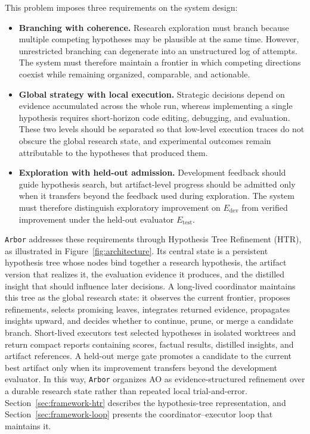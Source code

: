\documentclass{llmxive}
\providecommand{\arbor}{\texttt{Arbor}}
\begin{document}
This problem imposes three requirements on the system design:

\begin{itemize}[leftmargin=*]

    \item \textbf{Branching with coherence.} Research exploration must branch because multiple competing hypotheses may be plausible at the same time. However, unrestricted branching can degenerate into an unstructured log of attempts. The system must therefore maintain a frontier in which competing directions coexist while remaining organized, comparable, and actionable.

    \item \textbf{Global strategy with local execution.} Strategic decisions depend on evidence accumulated across the whole run, whereas implementing a single hypothesis requires short-horizon code editing, debugging, and evaluation. These two levels should be separated so that low-level execution traces do not obscure the global research state, and experimental outcomes remain attributable to the hypotheses that produced them.

    \item \textbf{Exploration with held-out admission.} Development feedback should guide hypothesis search, but artifact-level progress should be admitted only when it transfers beyond the feedback used during exploration. The system must therefore distinguish exploratory improvement on $E_{\mathrm{dev}}$ from verified improvement under the held-out evaluator $E_{\mathrm{test}}$.

\end{itemize}

\arbor{} addresses these requirements through Hypothesis Tree Refinement (HTR), as illustrated in Figure~\ref{fig:architecture}. Its central state is a persistent hypothesis tree whose nodes bind together a research hypothesis, the artifact version that realizes it, the evaluation evidence it produces, and the distilled insight that should influence later decisions. A long-lived coordinator maintains this tree as the global research state: it observes the current frontier, proposes refinements, selects promising leaves, integrates returned evidence, propagates insights upward, and decides whether to continue, prune, or merge a candidate branch. Short-lived executors test selected hypotheses in isolated worktrees and return compact reports containing scores, factual results, distilled insights, and artifact references. A held-out merge gate promotes a candidate to the current best artifact only when its improvement transfers beyond the development evaluator. In this way, \arbor{} organizes AO as evidence-structured refinement over a durable research state rather than repeated local trial-and-error. Section~\ref{sec:framework-htr} describes the hypothesis-tree representation, and Section~\ref{sec:framework-loop} presents the coordinator--executor loop that maintains it.
\end{document}
